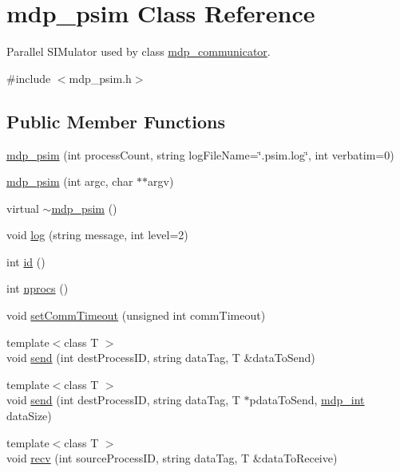 \hypertarget{classmdp__psim}{
\section{mdp\_\-psim Class Reference}
\label{classmdp__psim}
}


Parallel SIMulator used by class \hyperlink{classmdp__communicator}{mdp\_\-communicator}.  


{\ttfamily \#include $<$mdp\_\-psim.h$>$}\subsection*{Public Member Functions}
\begin{DoxyCompactItemize}
\item 
\hyperlink{classmdp__psim_aa3fd4da678b802e5f0d53787bec3f331}{mdp\_\-psim} (int processCount, string logFileName=\char`\"{}.psim.log\char`\"{}, int verbatim=0)
\item 
\hyperlink{classmdp__psim_af5320c53d620c8c66f1842cd6b546bf6}{mdp\_\-psim} (int argc, char $\ast$$\ast$argv)
\item 
virtual \hyperlink{classmdp__psim_ac6b26c66968872c6f6d71dff2bf0527f}{$\sim$mdp\_\-psim} ()
\item 
void \hyperlink{classmdp__psim_ab3b24379c623c72635210d348399414e}{log} (string message, int level=2)
\item 
int \hyperlink{classmdp__psim_add120eb0aa77a4b73d0844eda58b0570}{id} ()
\item 
int \hyperlink{classmdp__psim_a6377b54cc52e570452c048e5a97b8030}{nprocs} ()
\item 
void \hyperlink{classmdp__psim_a1bbcfd250b4df9520ae4ff07fefe9204}{setCommTimeout} (unsigned int commTimeout)
\item 
{\footnotesize template$<$class T $>$ }\\void \hyperlink{classmdp__psim_afe56014848f9405cc17cb772635e1aa5}{send} (int destProcessID, string dataTag, T \&dataToSend)
\item 
{\footnotesize template$<$class T $>$ }\\void \hyperlink{classmdp__psim_ad4f411191257a13fc36ef6ac40332638}{send} (int destProcessID, string dataTag, T $\ast$pdataToSend, \hyperlink{mdp__global__vars_8h_aaa1ad9d0dcd2124aa5af0120d9954174}{mdp\_\-int} dataSize)
\item 
{\footnotesize template$<$class T $>$ }\\void \hyperlink{classmdp__psim_a66099a8f714c4377ea4040a78b206983}{recv} (int sourceProcessID, string dataTag, T \&dataToReceive)
$$
\end{DoxyCompactItemize}
